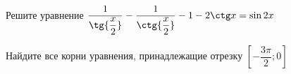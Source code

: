 \begin{ex}
	\begin{condition}
		\begin{enumcols}[label=\asbuk*)]
			\item Решите уравнение \( \dfrac{1}{\tg {\dfrac{x}{2}}}-\dfrac{1}{\ctg {\dfrac{x}{2}}}-1-2\ctg x = \sin 2x \)
			\item Найдите все корни уравнения, принадлежащие отрезку \( \left[-\dfrac{3\pi}{2};0\right] \)
		\end{enumcols}
	\end{condition}
\end{ex}